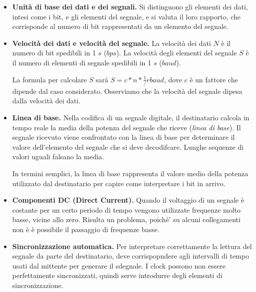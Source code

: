             \begin{itemize}
                \item \textbf{Unità di base dei dati e dei segnali.} Si distinguono gli elementi dei dati, intesi come i bit, e gli elementi del segnale, e si valuta il loro rapporto, che corrisponde al numero di bit rappresentati da un elemento del segnale.
                
                \item \textbf{Velocità dei dati e velocità del segnale.} La velocità dei dati $N$ è il numero di bit spedibili in 1 $s$ ($bps$). La velocità degli elementi del segnale $S$ è il numero di elementi di segnale spedibili in 1 $s$ ($baud$). 
                
                La formula per calcolare $S$ sarà \(S=c*n*\frac{1}/r baud\), dove $c$ è un fattore che dipende dal caso considerato. Osserviamo che la velocità del segnale dipesa dalla velocità dei dati.
                
                \item \textbf{Linea di base.} Nella codifica di un segnale digitale, il destinatario calcola in tempo reale la media della potenza del segnale che riceve (\textit{linea di base}). Il segnale ricevuto viene confrontato con la linea di base per determinare il valore dell'elemento del segnale che si deve decodifcare. Lunghe sequenze di valori uguali falsano la media.
                
                In termini semplici, la linea di base rappresenta il valore medio della potenza utilizzato dal destinatario per capire come interpretare i bit in arrivo.
                
                \item \textbf{Componenti DC (Direct Current).} Quando il voltaggio di un segnale è costante per un certo periodo di tempo vengono utilizzate frequenze molto basse, vicine allo zero. Risulta un problema, poiché' su alcuni collegamenti non è è possibile il passaggio di frequenze basse.
                
                \item \textbf{Sincronizzazione automatica.} Per interpretare correttamente la lettura del segnale da parte del destinatario, deve corrispopndere agli intervalli di tempo usati dal mittente per generare il sdegnale. I clock possono non essere perfettamente sincronizzati, quindi serve introdurre degli elementi di sincronizzazione.
            \end{itemize}
            
